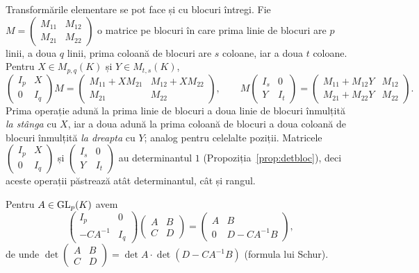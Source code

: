 Transformările elementare se pot face și cu blocuri întregi. Fie $M=\begin{pmatrix}M_{11}&M_{12}\\M_{21}&M_{22}\end{pmatrix}$ o matrice pe blocuri în care prima linie de blocuri are $p$ linii, a doua $q$ linii, prima coloană de blocuri are $s$ coloane, iar a doua $t$ coloane. Pentru $X\in M_{p,q}(K)$ și $Y\in M_{t,s}(K)$,
\[
\begin{pmatrix}I_p&X\\0&I_q\end{pmatrix}M=\begin{pmatrix}M_{11}+XM_{21}&M_{12}+XM_{22}\\M_{21}&M_{22}\end{pmatrix},
\qquad
M\begin{pmatrix}I_s&0\\Y&I_t\end{pmatrix}=\begin{pmatrix}M_{11}+M_{12}Y&M_{12}\\M_{21}+M_{22}Y&M_{22}\end{pmatrix}.
\]
Prima operație adună la prima linie de blocuri a doua linie de blocuri înmulțită \emph{la stânga} cu $X$, iar a doua adună la prima coloană de blocuri a doua coloană de blocuri înmulțită \emph{la dreapta} cu $Y$; analog pentru celelalte poziții. Matricele $\begin{pmatrix}I_p&X\\0&I_q\end{pmatrix}$ și $\begin{pmatrix}I_s&0\\Y&I_t\end{pmatrix}$ au determinantul $1$ (Propoziția~\ref{prop:detbloc}), deci aceste operații păstrează atât determinantul, cât și rangul.

\begin{exemplu}
Pentru $A\in\mathrm{GL}_p(K)$ avem
\[
\begin{pmatrix}I_p&0\\-CA^{-1}&I_q\end{pmatrix}\begin{pmatrix}A&B\\C&D\end{pmatrix}=\begin{pmatrix}A&B\\0&D-CA^{-1}B\end{pmatrix},
\]
de unde $\det\begin{pmatrix}A&B\\C&D\end{pmatrix}=\det A\cdot\det(D-CA^{-1}B)$ (formula lui Schur).
\end{exemplu}

